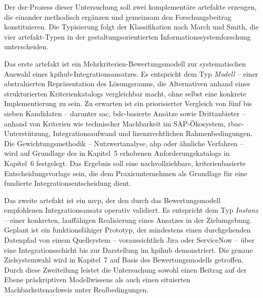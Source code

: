 Der \gls{dsr}-Prozess dieser Untersuchung soll zwei komplementäre \gls{artefakt}e erzeugen, die einander methodisch ergänzen und gemeinsam den Forschungsbeitrag konstituieren.
Die Typisierung folgt der Klassifikation nach March und Smith, die vier \gls{artefakt}-Typen in der gestaltungsorientierten Informationssystemforschung unterscheiden.

Das erste \gls{artefakt} ist ein Mehrkriterien-Bewertungsmodell zur systematischen Auswahl eines \gls{kpihub}-Integrationsansatzes.
Es entspricht dem Typ \textit{Modell} -- einer abstrahierten Repräsentation des Lösungsraums, die Alternativen anhand eines strukturierten Kriterienkatalogs vergleichbar macht, ohne selbst eine konkrete Implementierung zu sein.
Zu erwarten ist ein priorisierter Vergleich von fünf bis sieben Kandidaten -- darunter \gls{sac}, \gls{bdc}-basierte Ansätze sowie Drittanbieter -- anhand von Kriterien wie technischer Machbarkeit im SAP-Ökosystem, \gls{rbac}-Unterstützung, Integrationsaufwand und lizenzrechtlichen Rahmenbedingungen.
Die Gewichtungsmethodik -- Nutzwertanalyse, \gls{ahp} oder ähnliche Verfahren -- wird auf Grundlage des in Kapitel~5 erhobenen Anforderungskatalogs in Kapitel~6 festgelegt.
Das Ergebnis soll eine nachvollziehbare, kriterienbasierte Entscheidungsvorlage sein, die dem Praxisunternehmen als Grundlage für eine fundierte Integrationsentscheidung dient.

Das zweite \gls{artefakt} ist ein \gls{mvp}, der den durch das Bewertungsmodell empfohlenen Integrationsansatz operativ validiert.
Es entspricht dem Typ \textit{Instanz} -- einer konkreten, lauffähigen Realisierung eines Ansatzes in der Zielumgebung.
Geplant ist ein funktionsfähiger Prototyp, der mindestens einen durchgehenden Datenpfad von einem Quellsystem -- voraussichtlich Jira oder ServiceNow -- über eine Integrationsschicht bis zur Darstellung im \gls{kpihub} demonstriert.
Die genaue Zielsystemwahl wird in Kapitel~7 auf Basis des Bewertungsmodells getroffen.
Durch diese Zweiteilung leistet die Untersuchung sowohl einen Beitrag auf der Ebene präskriptiven Modellwissens als auch einen situierten Machbarkeitsnachweis unter Realbedingungen.

